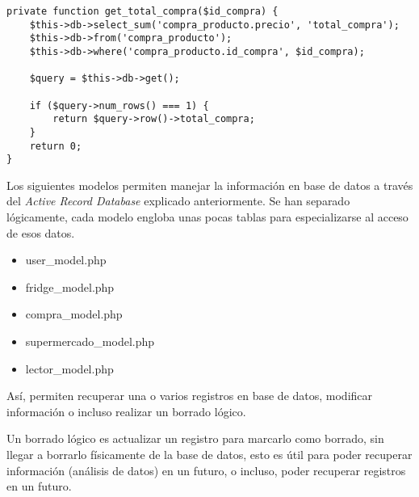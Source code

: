         \begin{lstlisting}
private function get_total_compra($id_compra) {
    $this->db->select_sum('compra_producto.precio', 'total_compra');
    $this->db->from('compra_producto');
    $this->db->where('compra_producto.id_compra', $id_compra);

    $query = $this->db->get();

    if ($query->num_rows() === 1) {
        return $query->row()->total_compra;
    }
    return 0;
}
        \end{lstlisting}

        Los siguientes modelos permiten manejar la información en base de datos a través del \emph{Active Record Database} explicado anteriormente. Se han separado lógicamente, cada modelo engloba unas pocas tablas para especializarse al acceso de esos datos.

        \begin{itemize}
            \item user\_model.php
            \item fridge\_model.php
            \item compra\_model.php
            \item supermercado\_model.php
            \item lector\_model.php
        \end{itemize}

        Así, permiten recuperar una o varios registros en base de datos, modificar información o incluso realizar un borrado lógico.

        Un borrado lógico es actualizar un registro para marcarlo como borrado, sin llegar a borrarlo físicamente de la base de datos, esto es útil para poder recuperar información (análisis de datos) en un futuro, o incluso, poder recuperar registros en un futuro.
